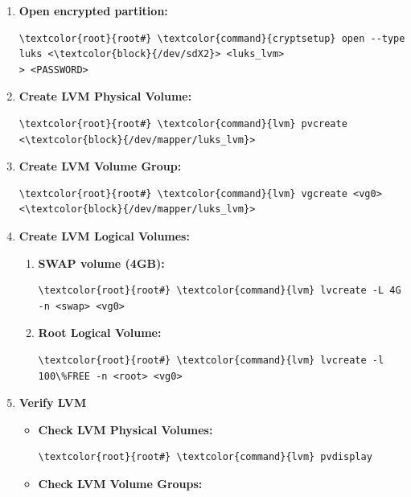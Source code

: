 \documentclass[10pt, a4paper, onecolumn, oneside, titlepage, openany]{book}
\begin{document}
\begin{enumerate}
    \item \textbf{Open encrypted partition:}
\begin{Verbatim}[commandchars=\\\{\}]
\textcolor{root}{root#} \textcolor{command}{cryptsetup} open --type luks <\textcolor{block}{/dev/sdX2}> <luks_lvm>
> <PASSWORD>
\end{Verbatim}
    \item \textbf{Create LVM Physical Volume:}
\begin{Verbatim}[commandchars=\\\{\}]
\textcolor{root}{root#} \textcolor{command}{lvm} pvcreate <\textcolor{block}{/dev/mapper/luks_lvm}>
\end{Verbatim}
    \item \textbf{Create LVM Volume Group:}
\begin{Verbatim}[commandchars=\\\{\}]
\textcolor{root}{root#} \textcolor{command}{lvm} vgcreate <vg0> <\textcolor{block}{/dev/mapper/luks_lvm}>
\end{Verbatim}
    \item \textbf{Create LVM Logical Volumes:}
    \begin{enumerate}
        \item \textbf{SWAP volume (4GB):}
\begin{Verbatim}[commandchars=\\\{\}]
\textcolor{root}{root#} \textcolor{command}{lvm} lvcreate -L 4G -n <swap> <vg0>
\end{Verbatim}
        \item \textbf{Root Logical Volume:}
\begin{Verbatim}[commandchars=\\\{\}]
\textcolor{root}{root#} \textcolor{command}{lvm} lvcreate -l 100\%FREE -n <root> <vg0>
\end{Verbatim}
    \end{enumerate}
    \item \textbf{Verify LVM}
    \begin{itemize}
        \item \textbf{Check LVM Physical Volumes:}
\begin{Verbatim}[commandchars=\\\{\}]
\textcolor{root}{root#} \textcolor{command}{lvm} pvdisplay
\end{Verbatim}
        \item \textbf{Check LVM Volume Groups:}
\begin{Verbatim}[commandchars=\\\{\}]

\end{Verbatim}
\end{itemize}
\end{enumerate}
\end{document}

